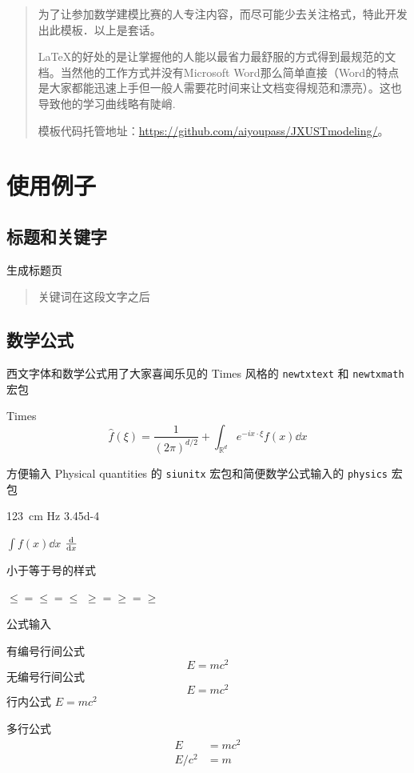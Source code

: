 \documentclass{JXUSTmodeling}
\begin{document}
\begin{abstract}
  为了让参加数学建模比赛的人专注内容，而尽可能少去关注格式，特此开发出此模板．以上是套话。

  LaTeX的好处的是让掌握他的人能以最省力最舒服的方式得到最规范的文档。当然他的工作方式并没有Microsoft Word那么简单直接（Word的特点是大家都能迅速上手但一般人需要花时间来让文档变得规范和漂亮）。这也导致他的学习曲线略有陡峭.
  
  模板代码托管地址：\url{https://github.com/aiyoupass/JXUSTmodeling/}。
\end{abstract}
\newpage
\tableofcontents

\section{使用例子}
\subsection{标题和关键字}
生成标题页
\begin{hexample}
\begin{abstract}
  关键词在这段文字之后
\end{abstract}
\end{hexample}
\subsection{数学公式}
西文字体和数学公式用了大家喜闻乐见的 Times 风格的 \texttt{newtxtext} 和 \texttt{newtxmath} 宏包
\begin{hexample}
Times
\[ \widehat{f}(\xi) = \frac{1}{(2\pi)^{d/2}}+ \int_{\mathbb{R}^d} e^{-ix \cdot \xi} f(x) \dd{x} \]
\end{hexample}

方便输入 Physical quantities 的 \texttt{siunitx} 宏包和简便数学公式输入的 \texttt{physics} 宏包
\begin{hexample}
\SI{123}{cm} \quad \si{Hz} \quad \num{3.45d-4}\par
$\int f(x) \dd{x}$ \quad $\dv{x}$
\end{hexample}

小于等于号的样式
\begin{hexample}
$\le = \leq = \leqslant$ \quad $\ge = \geq = \geqslant$
\end{hexample}
公式输入
\begin{hexample}
有编号行间公式
\begin{equation}\label{eq:example}
  E = mc^2
\end{equation}
无编号行间公式
\[ E = mc^2 \]
行内公式
$E = mc^2$\par
多行公式
\begin{align}
  E &= mc^2\\
  E/c^2 &= m
\end{align}
\end{hexample}
\end{document}
